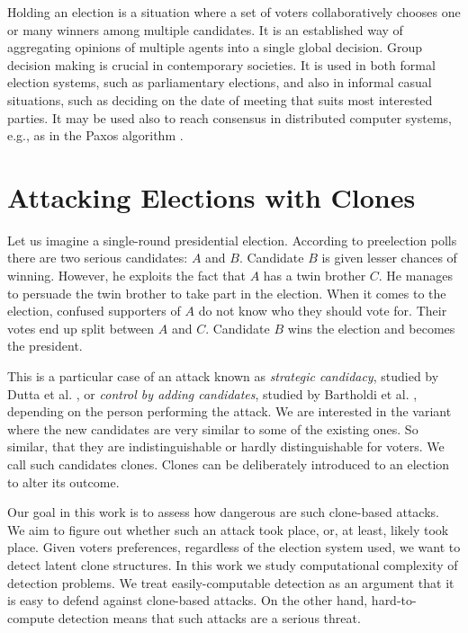 Holding an election is a situation where a set of voters collaboratively chooses
one or many winners among multiple candidates.
It is an established way of aggregating opinions of multiple agents into a single global decision.
Group decision making is crucial in contemporary societies.
It is used in both formal election systems, such as parliamentary elections,
and also in informal casual situations, such as deciding on the date of meeting that suits most interested parties.
It may be used also to reach consensus in distributed computer systems, e.g., as in the Paxos algorithm \cite{paxos}.

\section{Attacking Elections with Clones}

Let us imagine a single-round presidential election.
According to preelection polls there are two serious candidates: $A$ and $B$.
Candidate $B$ is given lesser chances of winning.
However, he exploits the fact that $A$ has a twin brother $C$.
He manages to persuade the twin brother to take part in the election.
When it comes to the election, confused supporters of $A$ do not know who they should vote for.
Their votes end up split between $A$ and $C$.
Candidate $B$ wins the election and becomes the president.

This is a particular case of an attack known as \textit{strategic candidacy},
studied by Dutta et al. \cite{strategiccandidacy},
or \textit{control by adding candidates}, studied by Bartholdi et al. \cite{controlbyadding},
depending on the person performing the attack.
We are interested in the variant where the new candidates are very similar to some of the existing ones.
So similar, that they are indistinguishable or hardly distinguishable for voters.
We call such candidates clones.
Clones can be deliberately introduced to an election to alter its outcome.

Our goal in this work is to assess how dangerous are such clone-based attacks.
We aim to figure out whether such an attack took place, or, at least, likely took place.
Given voters preferences, regardless of the election system used, we want to detect latent clone structures.
In this work we study computational complexity of detection problems.
We treat easily-computable detection as an argument that it is easy to defend against clone-based attacks.
On the other hand, hard-to-compute detection means that such attacks are a serious threat.


